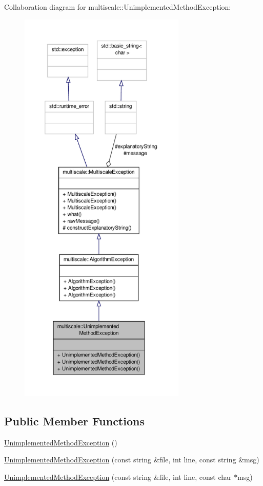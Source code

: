 Collaboration diagram for multiscale\-:\-:Unimplemented\-Method\-Exception\-:\nopagebreak
\begin{figure}[H]
\begin{center}
\leavevmode
\includegraphics[height=550pt]{classmultiscale_1_1UnimplementedMethodException__coll__graph}
\end{center}
\end{figure}
\subsection*{Public Member Functions}
\begin{DoxyCompactItemize}
\item 
\hyperlink{classmultiscale_1_1UnimplementedMethodException_aa2a92f12574928b5cfdc1a77d09080fe}{Unimplemented\-Method\-Exception} ()
\item 
\hyperlink{classmultiscale_1_1UnimplementedMethodException_af3e41ba96ee1376dece07e2f875cbc11}{Unimplemented\-Method\-Exception} (const string \&file, int line, const string \&msg)
\item 
\hyperlink{classmultiscale_1_1UnimplementedMethodException_aff17b782e719904081a27badd18740b2}{Unimplemented\-Method\-Exception} (const string \&file, int line, const char $\ast$msg)
\end{DoxyCompactItemize}
